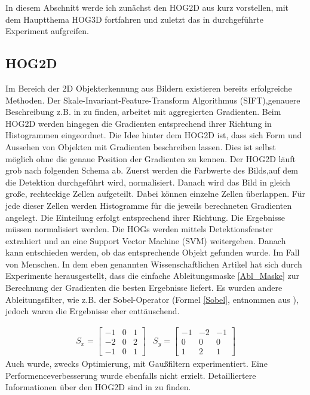 In diesem Abschnitt werde ich zunächst den HOG2D aus \cite{dalal2005histograms} kurz vorstellen, mit dem Hauptthema HOG3D fortfahren und zuletzt das in \cite{scherer2010histograms} durchgeführte Experiment aufgreifen.

\subsection{HOG2D}
Im Bereich der 2D Objekterkennung aus Bildern existieren bereits erfolgreiche Methoden. Der Skale-Invariant-Feature-Transform Algorithmus (SIFT),genauere Beschreibung z.B. in \cite{Priese15}
zu finden, arbeitet mit aggregierten Gradienten. Beim HOG2D werden hingegen die Gradienten entsprechend
ihrer Richtung in Histogrammen eingeordnet.
\newline
Die Idee hinter dem HOG2D ist, dass sich Form und Aussehen von Objekten mit Gradienten beschreiben lassen.
Dies ist selbst möglich ohne die genaue Position der Gradienten zu kennen. Der HOG2D läuft grob nach folgenden Schema ab. Zuerst werden die Farbwerte des Bilds,auf dem die Detektion durchgeführt wird, normalisiert. Danach wird das Bild in gleich große, rechteckige Zellen aufgeteilt. Dabei können einzelne Zellen überlappen. Für jede dieser Zellen werden Histogramme für die jeweils berechneten Gradienten angelegt. Die Einteilung erfolgt entsprechend ihrer Richtung. Die Ergebnisse müssen normalisiert werden. Die HOGs werden mittels Detektionsfenster extrahiert und an eine Support Vector Machine (SVM) weitergeben. Danach kann entschieden werden, ob das entsprechende Objekt gefunden wurde. Im Fall von \cite{dalal2005histograms} Menschen. In dem eben genannten Wissenschaftlichen Artikel hat sich durch Experimente herausgestellt, dass die einfache Ableitungsmaske \ref{Abl_Maske} zur Berechnung der Gradienten die besten Ergebnisse liefert. Es wurden andere Ableitungsfilter, wie z.B. der Sobel-Operator (Formel \ref{Sobel}, entnommen aus \cite{Priese15}), jedoch waren die Ergebnisse eher enttäuschend. 

\begin{align}
\label{Sobel}
	S_x =	\begin{bmatrix}
				-1 & 0 & 1 \\
				-2 & 0 & 2 \\
				-1 & 0 & 1 
			\end{bmatrix}  &  
	S_y =	\begin{bmatrix}
				-1 & -2 & -1 \\
				 0 & 0 &   0 \\
				 1 & 2 &   1 
			\end{bmatrix}	
\end{align}
Auch wurde, zwecks Optimierung, mit Gaußfiltern experimentiert. Eine Performenceverbesserung wurde ebenfalls nicht erzielt. 
Detailliertere Informationen über den HOG2D sind in \cite{dalal2005histograms} zu finden.


